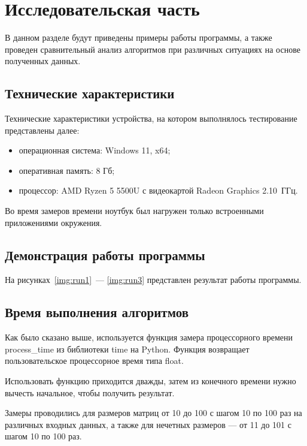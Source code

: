 \chapter{Исследовательская часть}

В данном разделе будут приведены примеры работы программы, а также проведен сравнительный анализ алгоритмов при различных ситуациях на основе полученных данных.

\section{Технические характеристики}

Технические характеристики устройства, на котором выполнялось тестирование представлены далее:
\begin{itemize}[label={---}]
	\item операционная система: Windows 11, x64;
	\item оперативная память: 8 Гб;
	\item процессор: AMD Ryzen 5 5500U с видеокартой Radeon Graphics 2.10~ГГц.
\end{itemize}

Во время замеров времени ноутбук был нагружен только встроенными приложениями окружения.

\section{Демонстрация работы программы}

На рисунках~\ref{img:run1}~--- \ref{img:run3} представлен результат работы программы.

\clearpage

\section{Время выполнения алгоритмов}

Как было сказано выше, используется функция замера процессорного времени process\_time из библиотеки time на Python. Функция возвращает пользовательское процессорное время типа float.

Использовать функцию приходится дважды, затем из конечного времени нужно вычесть начальное, чтобы получить результат.

Замеры проводились для размеров матриц от 10 до 100 с шагом 10 по 100 раз на различных входных данных, а также для нечетных размеров --- от 11 до 101 с шагом 10 по 100 раз.

